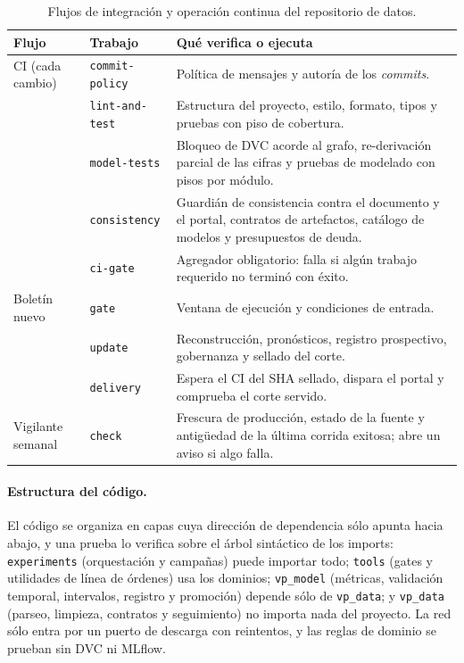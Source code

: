 \documentclass[12pt,letterpaper]{report}
\begin{document}
\begin{table}[htbp]
\centering
\footnotesize
\caption[Flujos de integración y operación continua]{Flujos de integración y operación
continua del repositorio de datos.}
\label{tab:mlops_ci}
\begin{tabular}{p{2.9cm}p{2.6cm}p{8.2cm}}
\toprule
\textbf{Flujo} & \textbf{Trabajo} & \textbf{Qué verifica o ejecuta} \\
\midrule
CI (cada cambio) & \texttt{commit-policy} & Política de mensajes y autoría de los \textit{commits}. \\
 & \texttt{lint-and-test} & Estructura del proyecto, estilo, formato, tipos y pruebas con piso de cobertura. \\
 & \texttt{model-tests} & Bloqueo de DVC acorde al grafo, re-derivación parcial de las cifras y pruebas de modelado con pisos por módulo. \\
 & \texttt{consistency} & Guardián de consistencia contra el documento y el portal, contratos de artefactos, catálogo de modelos y presupuestos de deuda. \\
 & \texttt{ci-gate} & Agregador obligatorio: falla si algún trabajo requerido no terminó con éxito. \\
\midrule
Boletín nuevo & \texttt{gate} & Ventana de ejecución y condiciones de entrada. \\
 & \texttt{update} & Reconstrucción, pronósticos, registro prospectivo, gobernanza y sellado del corte. \\
 & \texttt{delivery} & Espera el CI del SHA sellado, dispara el portal y comprueba el corte servido. \\
\midrule
Vigilante semanal & \texttt{check} & Frescura de producción, estado de la fuente y antigüedad de la última corrida exitosa; abre un aviso si algo falla. \\
\bottomrule
\end{tabular}
\end{table}

\paragraph{Estructura del código.} El código se organiza en capas cuya dirección de dependencia
sólo apunta hacia abajo, y una prueba lo verifica sobre el árbol sintáctico de los imports:
\texttt{experiments} (orquestación y campañas) puede importar todo; \texttt{tools} (gates y
utilidades de línea de órdenes) usa los dominios; \texttt{vp\_model} (métricas, validación
temporal, intervalos, registro y promoción) depende sólo de \texttt{vp\_data}; y \texttt{vp\_data}
(parseo, limpieza, contratos y seguimiento) no importa nada del proyecto. La red sólo entra por un
puerto de descarga con reintentos, y las reglas de dominio se prueban sin DVC ni MLflow.
\end{document}
